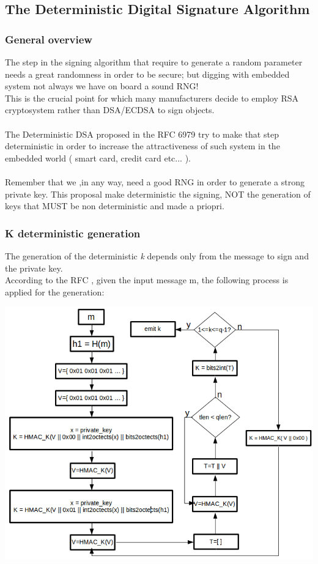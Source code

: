 \documentclass[11pt,english]{article}
\begin{document}
\subsection{The Deterministic Digital Signature Algorithm}

\subsubsection{General overview}
The step in the signing algorithm that require to generate a random parameter needs a great randomness in order to be secure; but digging with embedded system not always we have on board a sound RNG! \\This is the crucial point for which many manufacturers decide to employ RSA cryptosystem rather than DSA/ECDSA to sign objects.\\
\\The Deterministic DSA proposed in the RFC 6979 try to make that step deterministic in order to increase the attractiveness of such system in the embedded world ( smart card, credit card etc... ).\\\\
Remember that we ,in any way, need a good RNG in order to generate a strong private key. 
This proposal make deterministic the signing, NOT the generation of keys that MUST be non deterministic and made a priopri.


\subsubsection{K deterministic generation}

The generation of the deterministic \textit{k} depends only from the message to sign and the private key.\\
According to the RFC ,  given the input message m, the following process is applied for the generation:

\includegraphics[width=1.0\textwidth]{img/img_2.png} \\
\end{document}
